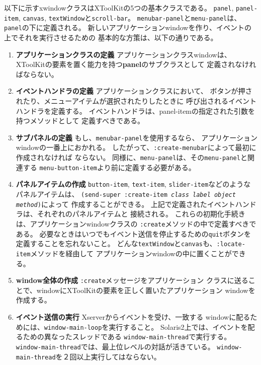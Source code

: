 以下に示すxwindowクラスはXToolKitの5つの基本クラスである。
{\tt panel}, {\tt panel-item},
{\tt canvas}, {\tt textWindow}と{\tt scroll-bar}。
{\tt menubar-panel}と{\tt menu-panel}は、{\tt panel}の下に定義される。
新しいアプリケーションwindowを作り、イベントの上でそれを実行させるための
基本的な方策は、以下の通りである。
\begin{enumerate}
\item{\bf アプリケーションクラスの定義} アプリケーションクラスwindowは、
XToolKitの要素を置く能力を持つ{\bf panel}のサブクラスとして
定義されなければならない。
\item{\bf イベントハンドラの定義} アプリケーションクラスにおいて、
ボタンが押されたり、メニューアイテムが選択されたりしたときに
呼び出されるイベントハンドラを定義する。
イベントハンドラは、panel-itemの指定された引数を持つメソッドとして
定義すべきである。
\item{\bf サブパネルの定義} もし、{\tt menubar-panel}を使用するなら、
アプリケーションwindowの一番上におかれる。
したがって、{\tt :create-menubar}によって最初に作成されなければ
ならない。
同様に、{\tt menu-panel}は、その{\tt menu-panel}と関連する
{\tt menu-button-item}より前に定義する必要がある。
\item{\bf パネルアイテムの作成} {\tt button-item},
{\tt text-item}, {\tt slider-item}などのようなパネルアイテムは、
{\tt (send-super :create-item {\em class label object method})}によって
作成することができる。
上記で定義されたイベントハンドラは、それぞれのパネルアイテムと
接続される。
これらの初期化手続きは、アプリケーションwindowクラスの
{\tt :create}メソッドの中で定義すべきである。
必要なときはいつでもイベント送信を停止するための{\tt quit}ボタンを
定義することを忘れないこと。
どんな{\tt textWindow}と{\tt canvas}も、{\tt :locate-item}メソッドを経由して
アプリケーションwindowの中に置くことができる。
\item{\bf window全体の作成} {\tt :create}メッセージをアプリケーション
クラスに送ることで、windowにXToolKitの要素を正しく置いたアプリケーション
windowを作成する。
\item{\bf イベント送信の実行} Xserverからイベントを受け、一致する
windowに配るためには、{\tt window-main-loop}を実行すること。
Solaris2上では、イベントを配るための異なったスレッドである
{\tt window-main-thread}で実行する。
{\tt window-main-thread}では、最上位レベルの対話が活きている。
{\tt window-main-thread}を２回以上実行してはならない。
\end{enumerate}

